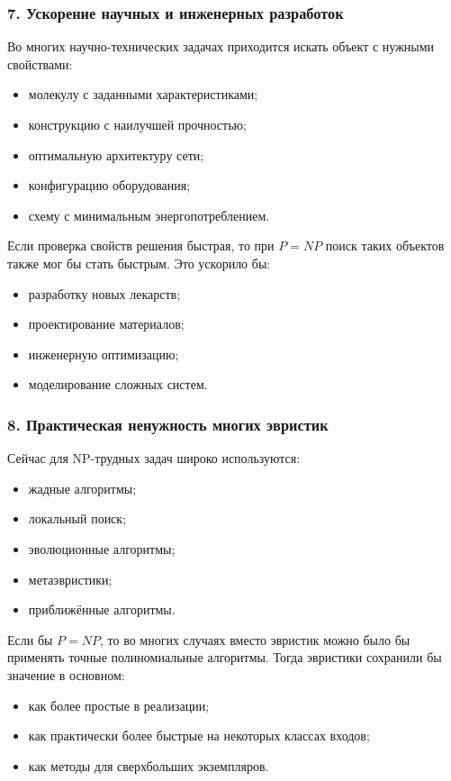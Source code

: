 \documentclass[12pt,a4paper]{article}
\theoremstyle{definition}
\theoremstyle{plain}
\begin{document}
\subsubsection{7. Ускорение научных и инженерных разработок}
Во многих научно-технических задачах приходится искать объект с нужными свойствами:
\begin{itemize}
\item молекулу с заданными характеристиками;
\item конструкцию с наилучшей прочностью;
\item оптимальную архитектуру сети;
\item конфигурацию оборудования;
\item схему с минимальным энергопотреблением.
\end{itemize}

Если проверка свойств решения быстрая, то при $P=NP$ поиск таких объектов также мог бы стать быстрым. Это ускорило бы:
\begin{itemize}
\item разработку новых лекарств;
\item проектирование материалов;
\item инженерную оптимизацию;
\item моделирование сложных систем.
\end{itemize}

\subsubsection{8. Практическая ненужность многих эвристик}
Сейчас для NP-трудных задач широко используются:
\begin{itemize}
\item жадные алгоритмы;
\item локальный поиск;
\item эволюционные алгоритмы;
\item метаэвристики;
\item приближённые алгоритмы.
\end{itemize}

Если бы $P=NP$, то во многих случаях вместо эвристик можно было бы применять точные полиномиальные алгоритмы. Тогда эвристики сохранили бы значение в основном:
\begin{itemize}
\item как более простые в реализации;
\item как практически более быстрые на некоторых классах входов;
\item как методы для сверхбольших экземпляров.
\end{itemize}
\end{document}
